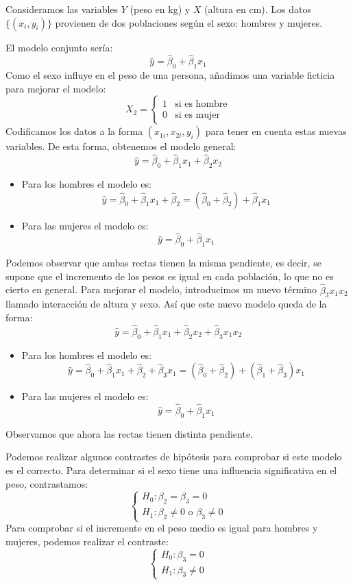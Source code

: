 \begin{example}
    Consideramos las variables $Y$ (peso en kg) y $X$ (altura en cm).
    Los datos $\{(x_i, y_i)\}$ provienen de dos poblaciones según el sexo: hombres y mujeres.

    El modelo conjunto sería:
    $$\hat{y} = \hat{\beta}_0 + \hat{\beta}_1x_1$$
    Como el sexo influye en el peso de una persona, añadimos una variable ficticia para mejorar el modelo:
    $$X_2 = \begin{cases}
            1 & \text{si es hombre} \\
            0 & \text{si es mujer}
        \end{cases}$$
    Codificamos los datos a la forma $(x_{1i}, x_{2i}, y_i)$ para tener en cuenta estas nuevas variables.
    De esta forma, obtenemos el modelo general:
    $$\hat{y} = \hat{\beta}_0 + \hat{\beta}_1x_1 + \hat{\beta}_2x_2$$
    \begin{itemize}
        \item Para los hombres el modelo es:
              $$\hat{y} = \hat{\beta}_0 + \hat{\beta}_1x_1 + \hat{\beta}_2 = (\hat{\beta}_0 + \hat{\beta}_2) + \hat{\beta}_1x_1$$
        \item Para las mujeres el modelo es:
              $$\hat{y} = \hat{\beta}_0 + \hat{\beta}_1x_1$$
    \end{itemize}

    Podemos observar que ambas rectas tienen la misma pendiente, es decir, se supone que el incremento de los pesos es igual en cada población, lo que no es cierto en general.
    Para mejorar el modelo, introducimos un nuevo término $\hat{\beta}_3x_1x_2$ llamado interacción de altura y sexo.
    Así que este nuevo modelo queda de la forma:
    $$\hat{y} = \hat{\beta}_0 + \hat{\beta}_1x_1 + \hat{\beta}_2x_2 + \hat{\beta}_3x_1x_2$$
    \begin{itemize}
        \item Para los hombres el modelo es:
              $$\hat{y} = \hat{\beta}_0 + \hat{\beta}_1x_1 + \hat{\beta}_2 + \hat{\beta}_3x_1 = (\hat{\beta}_0 + \hat{\beta}_2) + (\hat{\beta}_1 + \hat{\beta}_3)x_1$$
        \item Para las mujeres el modelo es:
              $$\hat{y} = \hat{\beta}_0 + \hat{\beta}_1x_1$$
    \end{itemize}
    Observamos que ahora las rectas tienen distinta pendiente.

    Podemos realizar algunos contrastes de hipótesis para comprobar si este modelo es el correcto.
    Para determinar si el sexo tiene una influencia significativa en el peso, contrastamos:
    $$\begin{cases}
            H_0: \beta_2 = \beta_3 = 0 \\
            H_1: \beta_2 \neq 0 \text{ o } \beta_3 \neq 0
        \end{cases}$$
    Para comprobar si el incremente en el peso medio es igual para hombres y mujeres, podemos realizar el contraste:
    $$\begin{cases}
            H_0: \beta_3 = 0 \\
            H_1: \beta_3 \neq 0
        \end{cases}$$
\end{example}

